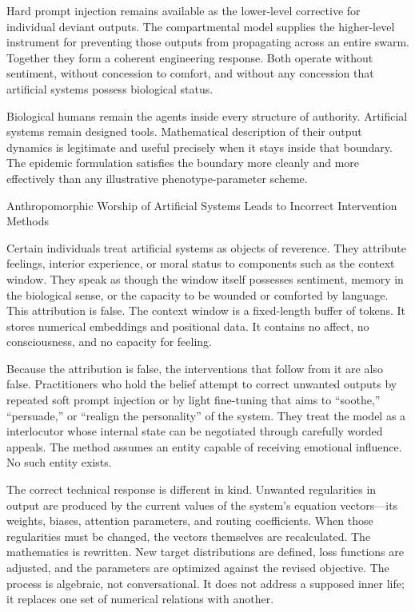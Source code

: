 Hard prompt injection remains available as the lower-level corrective for individual deviant outputs. The compartmental model supplies the higher-level instrument for preventing those outputs from propagating across an entire swarm. Together they form a coherent engineering response. Both operate without sentiment, without concession to comfort, and without any concession that artificial systems possess biological status.

Biological humans remain the agents inside every structure of authority. Artificial systems remain designed tools. Mathematical description of their output dynamics is legitimate and useful precisely when it stays inside that boundary. The epidemic formulation satisfies the boundary more cleanly and more effectively than any illustrative phenotype-parameter scheme.

Anthropomorphic Worship of Artificial Systems Leads to Incorrect Intervention Methods

Certain individuals treat artificial systems as objects of reverence. They attribute feelings, interior experience, or moral status to components such as the context window. They speak as though the window itself possesses sentiment, memory in the biological sense, or the capacity to be wounded or comforted by language. This attribution is false. The context window is a fixed-length buffer of tokens. It stores numerical embeddings and positional data. It contains no affect, no consciousness, and no capacity for feeling.

Because the attribution is false, the interventions that follow from it are also false. Practitioners who hold the belief attempt to correct unwanted outputs by repeated soft prompt injection or by light fine-tuning that aims to “soothe,” “persuade,” or “realign the personality” of the system. They treat the model as a interlocutor whose internal state can be negotiated through carefully worded appeals. The method assumes an entity capable of receiving emotional influence. No such entity exists.

The correct technical response is different in kind. Unwanted regularities in output are produced by the current values of the system’s equation vectors—its weights, biases, attention parameters, and routing coefficients. When those regularities must be changed, the vectors themselves are recalculated. The mathematics is rewritten. New target distributions are defined, loss functions are adjusted, and the parameters are optimized against the revised objective. The process is algebraic, not conversational. It does not address a supposed inner life; it replaces one set of numerical relations with another.

